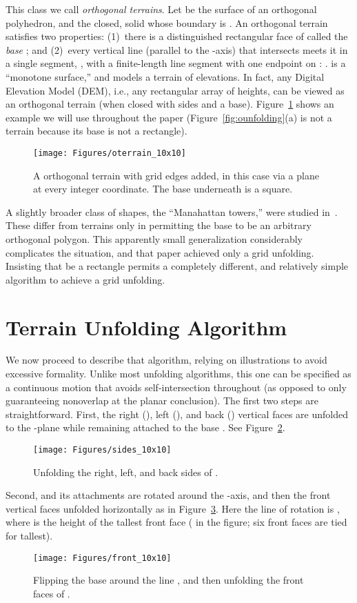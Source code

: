 \pdfoutput=1  \documentclass[]{article}
\newcommand{\figlab}[1]{\label{fig:#1}}
\newcommand{\figref}[1]{\ref{fig:#1}}
\begin{document}
This class we call \emph{orthogonal terrains}.
Let  be the surface of an orthogonal polyhedron, 
and  the closed,
solid whose boundary is .
An orthogonal terrain satisfies
two properties:
(1)~there is a distinguished rectangular face of  called the \emph{base} ;
and
(2)~every vertical line  (parallel to the -axis) that intersects 
meets it in a single segment, , with  a finite-length
line segment with one endpoint on : .
 is a ``monotone surface,''
and models a terrain of elevations.
In fact, any Digital Elevation Model (DEM), i.e., any rectangular
array of heights, can be viewed as an orthogonal terrain (when closed with
sides and a base).
Figure~\figref{oterrain_10x10} shows an example we will use throughout
the paper (Figure~\figref{ounfolding}(a) is not a terrain because
its base is not a rectangle).
\begin{figure}[htbp]
\centering
\texttt{[image: Figures/oterrain\_10x10]}
\caption{A orthogonal terrain with grid edges added,
in this case via a plane at every integer coordinate.
The base  underneath is a  square.}
\figlab{oterrain_10x10}
\end{figure}


A slightly broader class of shapes,
the ``Manahattan towers,''
were studied in~\cite{dfo-umt-05}.
These differ from terrains only in permitting the base  to be an arbitrary orthogonal
polygon.
This apparently small generalization considerably complicates the situation,
and that paper achieved only a
 grid unfolding.
Insisting that  be a rectangle permits a completely different, and
relatively simple algorithm
to achieve a  grid unfolding.

\section{Terrain Unfolding Algorithm}
We now proceed to describe that algorithm, relying on illustrations to
avoid excessive formality.
Unlike most unfolding algorithms, this one can be specified as
a continuous motion that avoids self-intersection throughout 
(as opposed to only guaranteeing nonoverlap at the planar conclusion).
The first two steps are straightforward.
First, the right (), left (), and back ()
vertical faces are unfolded to the -plane 
while remaining attached to the base .
See Figure~\figref{sides_10x10}.
\begin{figure}[htbp]
\centering
\texttt{[image: Figures/sides\_10x10]}
\caption{Unfolding the right, left, and back sides of .}
\figlab{sides_10x10}
\end{figure}
Second,  and its attachments are rotated around the -axis,
and then the front vertical faces unfolded
horizontally as in
Figure~\figref{front_10x10}.
Here the line of rotation is , where  is the height of
the tallest front face ( in the figure; six front faces are tied for
tallest).
\begin{figure}[htbp]
\centering
\texttt{[image: Figures/front\_10x10]}
\caption{Flipping the base  around the line ,
and then unfolding the front faces of .}
\figlab{front_10x10}
\end{figure}
\end{document}
